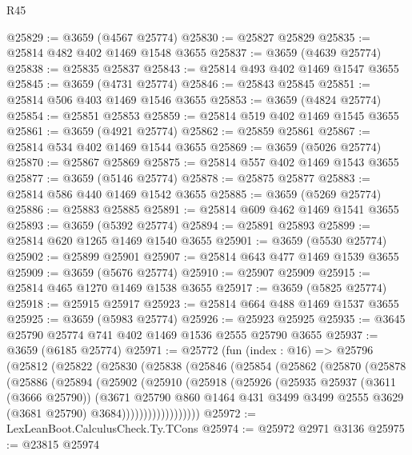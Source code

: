 \begin{lexlean}{R45}
\begin{coremodule}
@25829 := @3659 (@4567 @25774)
@25830 := @25827 @25829
@25835 := @25814 @482 @402 @1469 @1548 @3655
@25837 := @3659 (@4639 @25774)
@25838 := @25835 @25837
@25843 := @25814 @493 @402 @1469 @1547 @3655
@25845 := @3659 (@4731 @25774)
@25846 := @25843 @25845
@25851 := @25814 @506 @403 @1469 @1546 @3655
@25853 := @3659 (@4824 @25774)
@25854 := @25851 @25853
@25859 := @25814 @519 @402 @1469 @1545 @3655
@25861 := @3659 (@4921 @25774)
@25862 := @25859 @25861
@25867 := @25814 @534 @402 @1469 @1544 @3655
@25869 := @3659 (@5026 @25774)
@25870 := @25867 @25869
@25875 := @25814 @557 @402 @1469 @1543 @3655
@25877 := @3659 (@5146 @25774)
@25878 := @25875 @25877
@25883 := @25814 @586 @440 @1469 @1542 @3655
@25885 := @3659 (@5269 @25774)
@25886 := @25883 @25885
@25891 := @25814 @609 @462 @1469 @1541 @3655
@25893 := @3659 (@5392 @25774)
@25894 := @25891 @25893
@25899 := @25814 @620 @1265 @1469 @1540 @3655
@25901 := @3659 (@5530 @25774)
@25902 := @25899 @25901
@25907 := @25814 @643 @477 @1469 @1539 @3655
@25909 := @3659 (@5676 @25774)
@25910 := @25907 @25909
@25915 := @25814 @465 @1270 @1469 @1538 @3655
@25917 := @3659 (@5825 @25774)
@25918 := @25915 @25917
@25923 := @25814 @664 @488 @1469 @1537 @3655
@25925 := @3659 (@5983 @25774)
@25926 := @25923 @25925
@25935 := @3645 @25790 @25774 @741 @402 @1469 @1536 @2555 @25790 @3655
@25937 := @3659 (@6185 @25774)
@25971 := @25772
    (fun (index : @16) =>
    @25796
      (@25812
        (@25822
          (@25830
            (@25838
              (@25846
                (@25854
                  (@25862
                    (@25870
                      (@25878
                        (@25886
                          (@25894
                            (@25902
                              (@25910
                                (@25918
                                  (@25926
                                    (@25935
                                      @25937
                                      (@3611 (@3666 @25790))
                                      (@3671
                                        @25790
                                        @860
                                        @1464
                                        @431
                                        @3499
                                        @3499
                                        @2555
                                        @3629
                                        (@3681 @25790)
                                        @3684))))))))))))))))))
@25972 := LexLeanBoot.CalculusCheck.Ty.TCons
@25974 := @25972 @2971 @3136
@25975 := @23815 @25974

\end{coremodule}
\end{lexlean}
